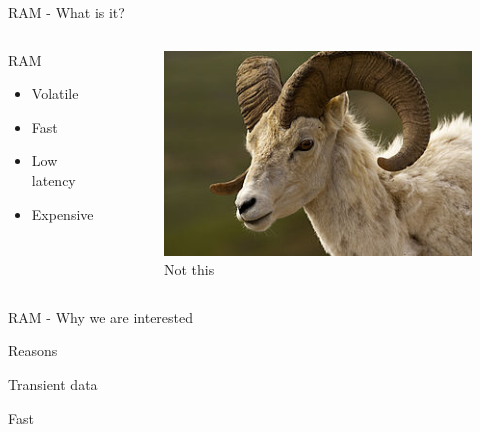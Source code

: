 \begin{frame}{RAM - What is it?}
\begin{columns}
    \begin{column}{0.47\textwidth}
    \begin{block}{RAM}
        \begin{itemize}
            \item Volatile 
            \item Fast
            \item Low latency
            \item Expensive
        \end{itemize}
    \end{block}
    \end{column}
    \begin{column}{0.47\textwidth}
        \begin{figure}
        \centering
        \includegraphics[width=\textwidth]{img/ram.jpg}
        \caption{Not this}
        \label{fig:my_label}
    \end{figure}
    \end{column}
\end{columns}
\end{frame}
\begin{frame}{RAM - Why we are interested}
    \begin{block}{Reasons}
        \item Transient data
        \item Fast
    \end{block}
\end{frame}
